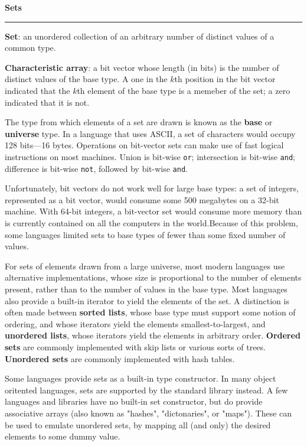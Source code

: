 \nopagenumbers
{\bf Sets}
\vskip 1mm
\hrule

\vskip 6pt
{\bf Set}: an unordered collection of an arbitrary number of distinct values of a common type.

\vskip 6pt
{\bf Characteristic array}: a bit vector whose length (in bits) is the number of distinct values of the base type. A one in the $k$th position in the bit vector indicated that the $k$th element of the base type is a memeber of the set; a zero indicated that it is not.

\vskip 6pt
The type from which elements of a set are drawn is known as the {\bf base} or {\bf universe} type. In a language that uses ASCII, a set of characters would occupy 128 bits---16 bytes. Operations on bit-vector sets can make use of fast logical instructions on most machines. Union is bit-wise {\tt or}; intersection is bit-wise {\tt and}; difference is bit-wise {\tt not}, followed by bit-wise {\tt and}.

\vskip 6pt
Unfortunately, bit vectors do not work well for large base types: a set of integers, represented as a bit vector, would consume some 500 megabytes on a 32-bit machine. With 64-bit integers, a bit-vector set would consume more memory than is currently contained on all the computers in the world.Because of this problem, some languages limited sets to base types of fewer than some fixed number of values.

\vskip 6pt
For sets of elements drawn from a large universe, most modern languages use alternative implementations, whose size is proportional to the number of elements present, rather than to the number of values in the base type. Most languages also provide a built-in iterator to yield the elements of the set. A distinction is often made between {\bf sorted lists}, whose base type must support some notion of ordering, and whose iterators yield the elements smallest-to-largest, and {\bf unordered lists}, whose iterators yield the elements in arbitrary order. {\bf Ordered sets} are commonly implemented with skip lists or various sorts of trees. {\bf Unordered sets} are commonly implemented with hash tables.

\vskip 6pt
Some languages provide sets as a built-in type constructor. In many object oritented languages, sets are supported by the standard library instead. A few languages and libraries have no built-in set constructor, but do provide associative arrays (also known as "hashes", "dictonaries", or "maps"). These can be used to emulate unordered sets, by mapping all (and only) the desired elements to some dummy value.

\vfill\eject
\bye
